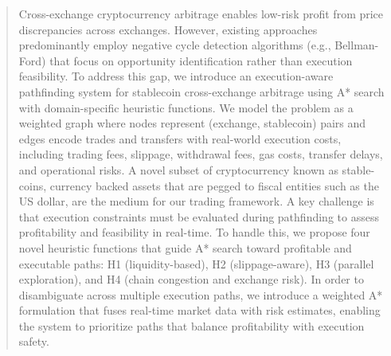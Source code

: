 \begin{abstract}
Cross-exchange cryptocurrency arbitrage enables low-risk profit from price discrepancies across exchanges. However, existing approaches predominantly employ negative cycle detection algorithms (e.g., Bellman-Ford) that focus on opportunity identification rather than execution feasibility. To address this gap, we introduce an execution-aware pathfinding system for stablecoin cross-exchange arbitrage using A* search with domain-specific heuristic functions. We model the problem as a weighted graph where nodes represent (exchange, stablecoin) pairs and edges encode trades and transfers with real-world execution costs, including trading fees, slippage, withdrawal fees, gas costs, transfer delays, and operational risks. A novel subset of cryptocurrency known as stable-coins, currency backed assets that are pegged to fiscal entities such as the US dollar, are the medium for our trading framework. A key challenge is that execution constraints must be evaluated during pathfinding to assess profitability and feasibility in real-time. To handle this, we propose four novel heuristic functions that guide A* search toward profitable and executable paths: H1 (liquidity-based), H2 (slippage-aware), H3 (parallel exploration), and H4 (chain congestion and exchange risk). In order to disambiguate across multiple execution paths, we introduce a weighted A* formulation that fuses real-time market data with risk estimates, enabling the system to prioritize paths that balance profitability with execution safety.
\end{abstract}